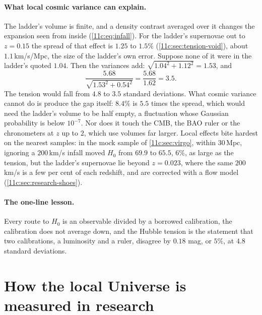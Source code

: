 \paragraph{What local cosmic variance can explain.} The ladder's volume is finite, and a
density contrast averaged over it changes the expansion seen from inside (\cref{11c:eq:infall}).
For the ladder's supernovae out to $z=0.15$ the spread of that effect is $1.25$ to
$1.5\%$ (\cref{11c:sec:tension-void}), about $1.1$\,km/s/Mpc, the size of the ladder's own
error. Suppose none of it were in the ladder's quoted $1.04$. Then the variances add:
$\sqrt{1.04^2+1.12^2}=1.53$, and
\[
  \frac{5.68}{\sqrt{1.53^2+0.54^2}}=\frac{5.68}{1.62}=3.5 .
\]
The tension would fall from $4.8$ to $3.5$ standard deviations. What cosmic variance cannot do
is produce the gap itself: $8.4\%$ is $5.5$ times the spread, which would need
the ladder's volume to be half empty, a fluctuation whose Gaussian probability is below
$10^{-7}$. Nor does it touch the CMB, the BAO ruler or the chronometers at $z$ up to $2$, which
use volumes far larger. Local effects bite hardest on the nearest samples: in the mock sample of
\cref{11c:sec:virgo}, within $30$\,Mpc, ignoring a $200$\,km/s infall moved $H_0$ from $69.9$ to $65.5$,
$6\%$, as large as the tension, but the ladder's supernovae lie beyond $z=0.023$, where the same $200$\,km/s is a few per
cent of each redshift, and are corrected with a flow model (\cref{11c:sec:research-shoes}).

\paragraph{The one-line lesson.} Every route to $H_0$ is an observable divided by a borrowed
calibration, the calibration does not average down, and the Hubble tension is the statement that two
calibrations, a luminosity and a ruler, disagree by $0.18$ mag, or $5\%$, at $4.8$ standard deviations.
\section{How the local Universe is measured in research}
\label{11c:sec:research}

